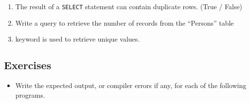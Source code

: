 \documentclass[11pt,a4paper]{article}
\begin{document}
\begin{enumerate}
\item The result of a \texttt{SELECT} statement can contain duplicate rows. (True / False)

\item Write a query to retrieve the number of records from the ``Persons'' table \underline{\hspace{3cm}}

\item \underline{\hspace{3cm}} keyword is used to retrieve unique values.


\end{enumerate}

\subsection*{Exercises}
\begin{itemize}
\item Write the expected output, or compiler errors if any, for each of the following programs.
\end{itemize}
\end{document}
